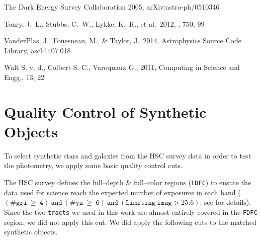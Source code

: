 \documentclass[useamsfonts]{pasj01}
\def\tracts{\texttt{tracts}}
\begin{document}
\begin{thebibliography}{}
     The Dark Energy
             Survey Collaboration 2005, arXiv:astro-ph/0510346

     Tonry, J.~L., Stubbs, C.~W., Lykke, K.~R.,
             et al.\ 2012, \apj, 750, 99

     VanderPlas, J., Fouesneau, M., \&
             Taylor, J.\ 2014, Astrophysics Source Code Library, ascl:1407.018

     Walt S. v. d., Colbert S. C., Varoquaux G.,
             2011, Computing in Science and Engg., 13, 22

\end{thebibliography}


\appendix
\section{Quality Control of Synthetic Objects}
    \label{app:qc}

    To select synthetic stars and galaxies from the HSC survey data in order to test
    the photometry, we apply some basic quality control cuts.

    The HSC survey defines the full--depth \& full--color regions (\texttt{FDFC}) to
    ensure the data used for science reach the expected number of exposures in each
    band
    ($\mathtt{(\#gri\ \geq\ 4)\ and\ (\#yz\ \geq\ 6)\ and\ (Limiting\ imag> 25.6)}$;
    see \citealt{HSCDR1} for details).
    Since the two \tracts{} we used in this work are almost entirely covered in
    the \texttt{FDFC} region, we did not apply this cut.
    We did apply the following cuts to the matched synthetic objects.
\end{document}
